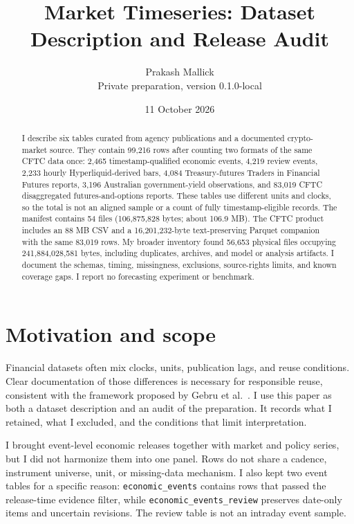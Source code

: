 \documentclass[10pt]{article}
\title{Market Timeseries: Dataset Description and Release Audit}
\author{Prakash Mallick\\\small Private preparation, version 0.1.0-local}
\date{11 October 2026}
\begin{document}
\maketitle

\begin{abstract}
I describe six tables curated from agency publications and a documented crypto-market source. They contain 99,216 rows after counting two formats of the same CFTC data once: 2,465 timestamp-qualified economic events, 4,219 review events, 2,233 hourly Hyperliquid-derived bars, 4,084 Treasury-futures Traders in Financial Futures reports, 3,196 Australian government-yield observations, and 83,019 CFTC disaggregated futures-and-options reports. These tables use different units and clocks, so the total is not an aligned sample or a count of fully timestamp-eligible records. The manifest contains 54 files (106,875,828 bytes; about 106.9 MB). The CFTC product includes an 88 MB CSV and a 16,201,232-byte text-preserving Parquet companion with the same 83,019 rows. My broader inventory found 56,653 physical files occupying 241,884,028,581 bytes, including duplicates, archives, and model or analysis artifacts. I document the schemas, timing, missingness, exclusions, source-rights limits, and known coverage gaps. I report no forecasting experiment or benchmark.
\end{abstract}

\section{Motivation and scope}
Financial datasets often mix clocks, units, publication lags, and reuse conditions. Clear documentation of those differences is necessary for responsible reuse, consistent with the framework proposed by Gebru et al.~\cite{gebru2021}. I use this paper as both a dataset description and an audit of the preparation. It records what I retained, what I excluded, and the conditions that limit interpretation.

I brought event-level economic releases together with market and policy series, but I did not harmonize them into one panel. Rows do not share a cadence, instrument universe, unit, or missing-data mechanism. I also kept two event tables for a specific reason: \texttt{economic\_events} contains rows that passed the release-time evidence filter, while \texttt{economic\_events\_review} preserves date-only items and uncertain revisions. The review table is not an intraday event sample.
\end{document}
